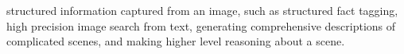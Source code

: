 \documentclass[runningheads]{llncs}
\begin{document}
structured information captured from an image, such as  structured fact tagging, high precision image search from text, generating comprehensive descriptions of complicated scenes, and making higher level reasoning about a scene. %
\end{document}

